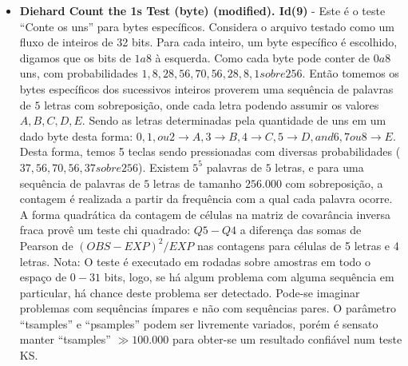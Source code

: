 \begin{itemize}
   \item \textbf{Diehard Count the 1s Test (byte) (modified). Id(9)} - Este é o teste ``Conte os uns'' para bytes específicos. Considera o arquivo testado como um fluxo de inteiros de 32 bits. Para cada inteiro, um byte específico é escolhido, digamos que os bits de $1 a 8$ à esquerda. Como cada byte pode conter de $0 a 8$ uns, com probabilidades $1, 8, 28, 56, 70, 56, 28, 8, 1 sobre 256$. Então tomemos os bytes específicos dos sucessivos inteiros proverem uma sequência de palavras de $5$ letras com sobreposição, onde cada letra podendo assumir os valores $A, B, C, D, E$. Sendo as letras determinadas pela quantidade de uns em um dado byte desta forma: $0, 1, ou 2 \rightarrow A, 3 \rightarrow B, 4 \rightarrow C, 5 \rightarrow D,  and 6, 7 ou 8 \rightarrow E$. Desta forma, temos 5 teclas sendo pressionadas com diversas probabilidades ($37,56,70,56,37 sobre 256$). Existem $5^{5}$ palavras de $5$ letras, e para uma sequência de palavras de $5$ letras de tamanho $256.000$ com sobreposição, a contagem é realizada a partir da frequência com a qual cada palavra ocorre. A forma quadrática da contagem de células na matriz de covarância inversa fraca provê um teste chi quadrado: $Q5-Q4$ a diferença das somas de Pearson de $(OBS-EXP)^2/EXP$ nas contagens para células de 5 letras e 4 letras. Nota: O teste é executado em rodadas sobre amostras em todo o espaço de $0-31$ bits, logo, se há algum problema com alguma sequência em particular, há chance deste problema ser detectado. Pode-se imaginar problemas com sequências ímpares e não com sequências pares. O parâmetro ``tsamples'' e ``psamples'' podem ser livremente variados, porém é sensato manter ``tsamples'' $\gg 100.000$ para obter-se um resultado confiável num teste KS.


\end{itemize}
